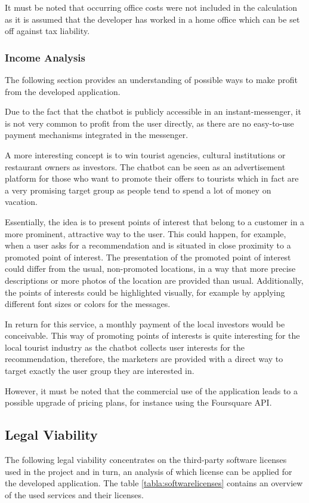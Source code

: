 It must be noted that occurring office costs were not included in the calculation as it is assumed that the developer has worked in a home office which can be set off against tax liability.

\subsubsection{Income Analysis}
The following section provides an understanding of possible ways to make profit from the developed application. 

Due to the fact that the chatbot is publicly accessible in an instant-messenger, it is not very common to profit from the user directly, as there are no easy-to-use payment mechanisms integrated in the messenger. 

A more interesting concept is to win tourist agencies, cultural institutions or restaurant owners as investors. The chatbot can be seen as an advertisement platform for those who want to promote their offers to tourists which in fact are a very promising target group as people tend to spend a lot of money on vacation.

Essentially, the idea is to present points of interest that belong to a customer in a more prominent, attractive way to the user. This could happen, for example, when a user asks for a recommendation and is situated in close proximity to a promoted point of interest. The presentation of the promoted point of interest could differ from the usual, non-promoted locations, in a way that more precise descriptions or more photos of the location are provided than usual. Additionally, the points of interests could be highlighted visually, for example by applying different font sizes or colors for the messages. 

In return for this service, a monthly payment of the local investors would be conceivable. 
This way of promoting points of interests is quite interesting for the local tourist industry as the chatbot collects user interests for the recommendation, therefore, the marketers are provided with a direct way to target exactly the user group they are interested in.

However, it must be noted that the commercial use of the application leads to a possible upgrade of pricing plans, for instance using the Foursquare API.

\subsection{Legal Viability}
The following legal viability concentrates on the third-party software licenses used in the project and in turn, an analysis of which license can be applied for the developed application. The table \ref{tabla:softwarelicenses} contains an overview of the used services and their licenses.

